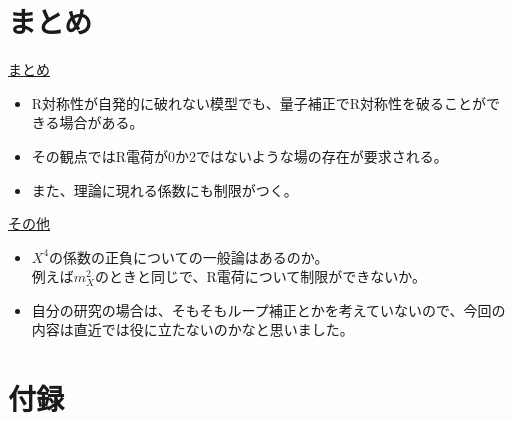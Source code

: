 \documentclass[
  unicode,a4paper,9pt,
  xcolor = {dvipsnames,svgnames},
  hyperref ={colorlinks=true,citecolor=Navy,linkcolor=NavyBlue,urlcolor=purple},
  ja=standard,lualatex
]{beamer}
\begin{document}
\section{まとめ}

\begin{frame}[plain]
  \huge \secname
\end{frame}

\begin{frame}

  \uline{まとめ}
  \begin{itemize}
    \item
    R対称性が自発的に破れない模型でも、量子補正でR対称性を破ることができる場合がある。
    \item 
    その観点ではR電荷が0か2ではないような場の存在が要求される。
    \item 
    また、理論に現れる係数にも制限がつく。
  \end{itemize}

  \uline{その他}
  \begin{itemize}
    \item
          $X^4$の係数の正負についての一般論はあるのか。\\
          例えば$m_{X}^2$のときと同じで、R電荷について制限ができないか。
    \item
          自分の研究の場合は、そもそもループ補正とかを考えていないので、今回の内容は直近では役に立たないのかなと思いました。
  \end{itemize}

\end{frame}



\setcounter{Appendix}{\value{framenumber}}
\setcounter{section}{0}
\renewcommand{\thesubsection}{\Alph{subsection}}
\makeatletter
\renewcommand{\theequation}{\thesubsection.\arabic{equation}}

\renewcommand{\thefigure}{\thesubsection.\arabic{figure}}

\renewcommand{\thetable}{\thesubsection.\arabic{table}}
\makeatother

\section{付録}

\begin{frame}[plain]
  \frametitle{\ }
  \huge \secname
\end{frame}
\end{document}
